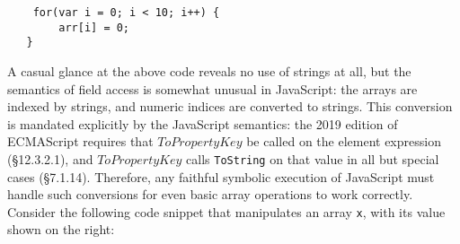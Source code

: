 \documentclass[sigplan,review,anonymous]{acmart}\settopmatter{printfolios=true,printccs=false,printacmref=false}
\begin{document}






\begin{center}
	\begin{minipage}{5cm}
		\begin{verbatim}
    for(var i = 0; i < 10; i++) {
        arr[i] = 0;
   }
		\end{verbatim}
	\end{minipage}
\end{center}



A casual glance at the above code reveals no use of strings at all, but the semantics of field access is somewhat unusual in JavaScript: the arrays are indexed by strings, and numeric indices are converted to strings. This conversion is mandated explicitly by the JavaScript semantics: the 2019 edition of ECMAScript \cite{?} requires that $ToPropertyKey$ be called on the element expression (\S{12.3.2.1}), and $ToPropertyKey$ calls {\tt{ToString}} on that value in all but special cases (\S{7.1.14}). Therefore, any faithful symbolic execution of JavaScript must handle such conversions for even basic array operations to work correctly. Consider the following code snippet that manipulates an array \texttt{x}, with its value shown on the right:
\end{document}
